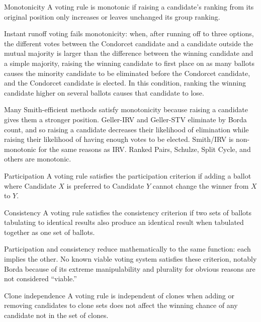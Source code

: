 \begin{definition}{Monotonicity}
    A voting rule is monotonic if raising a candidate's ranking from its original position only increases or leaves unchanged its group ranking.
\end{definition}

Instant runoff voting fails monotonicity:  when, after running off to three options, the different votes between the Condorcet candidate and a candidate outside the mutual majority is larger than the difference between the winning candidate and a simple majority, raising the winning candidate to first place on as many ballots causes the minority candidate to be eliminated before the Condorcet candidate, and the Condorcet candidate is elected.  In this condition, ranking the winning candidate higher on several ballots causes that candidate to lose.

Many Smith-efficient methods satisfy monotonicity because raising a candidate gives them a stronger position.  Geller-IRV and Geller-STV eliminate by Borda count, and so raising a candidate decreases their likelihood of elimination while raising their likelihood of having enough votes to be elected.  Smith/IRV is non-monotonic for the same reasons as IRV.  Ranked Pairs, Schulze, Split Cycle, and others are monotonic.

\begin{definition}{Participation}
    A voting rule satisfies the participation criterion if adding a ballot where Candidate $X$ is preferred to Candidate $Y$ cannot change the winner from $X$ to $Y$.
\end{definition}

\begin{definition}{Consistency}
    A voting rule satisfies the consistency criterion if two sets of ballots tabulating to identical results also produce an identical result when tabulated together as one set of ballots.
\end{definition}

Participation and consistency reduce mathematically to the same function:  each implies the other.  No known viable voting system satisfies these criterion, notably Borda because of its extreme manipulability and plurality for obvious reasons are not considered ``viable.''

\begin{definition}{Clone independence}
    A voting rule is independent of clones when adding or removing candidates to clone sets does not affect the winning chance of any candidate not in the set of clones.
\end{definition}

